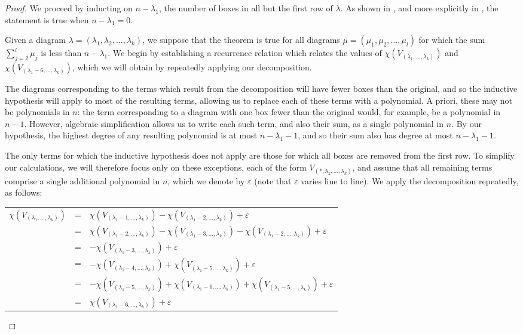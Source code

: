 \documentclass[12pt]{amsart}
\theoremstyle{definition}
\begin{document}
\begin{proof}

We proceed by inducting on $n-\lambda_1$, the number of boxes in all but the first row of $\lambda$. As shown in \cite{B}, and more explicitly in \cite{LL}, the statement is true when $n - \lambda_1=0$.

Given a diagram $\lambda = (\lambda_1, \lambda_2, ..., \lambda_k)$, we suppose that the theorem is true for all diagrams $\mu = (\mu_1, \mu_2, ..., \mu_l)$ for which the sum $\sum_{j=2}^l \mu_j$ is less than $n - \lambda_1$. We begin by establishing a recurrence relation which relates the values of $\chi(V_{(\lambda_1, ..., \lambda_k)})$ and $\chi(V_{(\lambda_1-6, ..., \lambda_k)})$, which we will obtain by repeatedly applying our decomposition. 

The diagrams corresponding to the terms which result from the decomposition will have fewer boxes than the original, and so the inductive hypothesis will apply to most of the resulting terms, allowing us to replace each of these terms with a polynomial. A priori, these may not be polynomials in $n$: the term corresponding to a diagram with one box fewer than the original would, for example, be a polynomial in $n-1$. However, algebraic simplification allows us to write each such term, and also their sum, as a single polynomial in $n$. By our hypothesis, the highest degree of any resulting polynomial is at most $n - \lambda_1 - 1$, and so their sum also has degree at most $n - \lambda_1 - 1$.

The only terms for which the inductive hypothesis does not apply are those for which all boxes are removed from the first row. To simplify our calculations, we will therefore focus only on these exceptions, each of the form $V_{(*, \lambda_2, ..., \lambda_k)}$, and assume that all remaining terms comprise a single additional polynomial in $n$, which we denote by $\varepsilon$ (note that $\varepsilon$ varies line to line). We apply the decomposition repeatedly, as follows:

\begin{center}
    \begin{tabular}{lcl}
        $\chi(V_{(\lambda_1, ..., \lambda_k)})$ & = & $\chi(V_{(\lambda_1-1, ..., \lambda_k)}) - \chi(V_{(\lambda_1-2, ..., \lambda_k)}) + \varepsilon$ \\
        & = & $\chi(V_{(\lambda_1-2, ..., \lambda_k)}) - \chi(V_{(\lambda_1-3, ..., \lambda_k)}) -\chi(V_{(\lambda_1-2, ..., \lambda_k)}) + \varepsilon$ \\
         & = & $-\chi(V_{(\lambda_1-3, ..., \lambda_k)}) + \varepsilon$ \\
         & = & $-\chi(V_{(\lambda_1-4, ..., \lambda_k)}) + \chi(V_{(\lambda_1-5, ..., \lambda_k)}) + \varepsilon$ \\
         & = & $-\chi(V_{(\lambda_1-5, ..., \lambda_k)}) + \chi(V_{(\lambda_1-6, ..., \lambda_k)}) + \chi(V_{(\lambda_1-5, ..., \lambda_k)}) + \varepsilon$ \\
         & = & $\chi(V_{(\lambda_1-6, ..., \lambda_k)}) + \varepsilon$ \\
    \end{tabular}
\end{center}


\end{proof}
\end{document}
